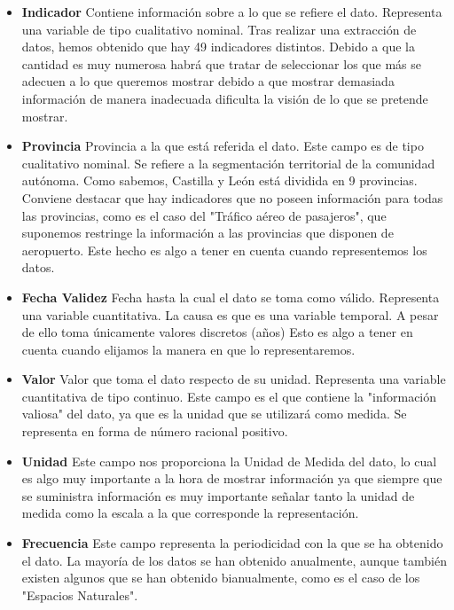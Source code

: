 \documentclass{article}
\begin{document}
			\begin{itemize}
			
				\item {\bf Indicador } Contiene información sobre a lo que se refiere el dato. Representa una variable de tipo cualitativo nominal. Tras realizar una extracción de datos, hemos obtenido que hay 49 indicadores distintos. Debido a que la cantidad es muy numerosa habrá que tratar de seleccionar los que más se adecuen a lo que queremos mostrar debido a que mostrar demasiada información de manera inadecuada dificulta la visión de lo que se pretende mostrar.
				
				\item {\bf Provincia } Provincia a la que está referida el dato. Este campo es de tipo cualitativo nominal. Se refiere a la segmentación territorial de la comunidad autónoma. Como sabemos, Castilla y León está dividida en 9 provincias. Conviene destacar que hay indicadores que no poseen información para todas las provincias, como es el caso del "Tráfico aéreo de pasajeros", que suponemos restringe la información a las provincias que disponen de aeropuerto. Este hecho es algo a tener en cuenta cuando representemos los datos.

				\item {\bf Fecha Validez } Fecha hasta la cual el dato se toma como válido. Representa una variable cuantitativa. La causa es que es una variable temporal. A pesar de ello toma únicamente valores discretos (años) Esto es algo a tener en cuenta cuando elijamos la manera en que lo representaremos.

				\item {\bf Valor } Valor que toma el dato respecto de su unidad.  Representa una variable cuantitativa de tipo continuo. Este campo es el que contiene la "información valiosa" del dato, ya que es la unidad que se utilizará como medida. Se representa en forma de número racional positivo.

				\item {\bf Unidad } Este campo nos proporciona la Unidad de Medida del dato, lo cual es algo muy importante a la hora de mostrar información ya que siempre que se suministra información es muy importante señalar tanto la unidad de medida como la escala a la que corresponde la representación.

				\item {\bf Frecuencia } Este campo representa la periodicidad con la que se ha obtenido el dato. La mayoría de los datos se han obtenido anualmente, aunque también existen algunos que se han obtenido bianualmente, como es el caso de los "Espacios Naturales".
			
			\end{itemize}			
\end{document}
